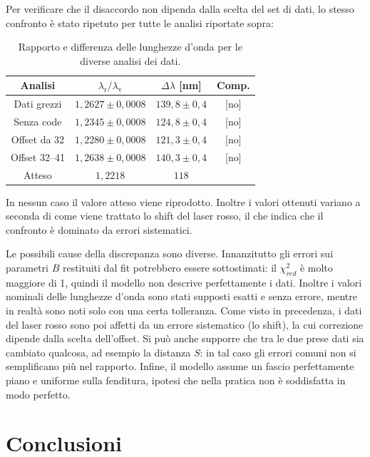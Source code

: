 \documentclass[10pt,twocolumn]{article}
\begin{document}
\noindent
Per verificare che il disaccordo non dipenda dalla scelta del set di dati, lo stesso confronto è stato ripetuto
per tutte le analisi riportate sopra:

\begin{table}[H]
  \centering
  \small
  \begin{tabular}{cccc}
    \toprule
    Analisi & $\lambda_{\mathrm{r}}/\lambda_{\mathrm{v}}$ & $\Delta\lambda$ [nm] & Comp. \\
    \midrule
    Dati grezzi & $1{,}2627 \pm 0{,}0008$ & $139{,}8 \pm 0{,}4$ & [no] \\
    Senza code & $1{,}2345 \pm 0{,}0008$ & $124{,}8 \pm 0{,}4$ & [no] \\
    Offset da 32 & $1{,}2280 \pm 0{,}0008$ & $121{,}3 \pm 0{,}4$ & [no] \\
    Offset 32--41 & $1{,}2638 \pm 0{,}0008$ & $140{,}3 \pm 0{,}4$ & [no] \\
    \midrule
    Atteso & $1{,}2218$ & $118$ & \\
    \bottomrule
  \end{tabular}
  \caption{Rapporto e differenza delle lunghezze d'onda per le diverse analisi dei dati.}
  \label{tab:robustezza_lambda}
\end{table}

\noindent
In nessun caso il valore atteso viene riprodotto. Inoltre i valori ottenuti variano a seconda di come viene trattato
lo shift del laser rosso, il che indica che il confronto è dominato da errori sistematici.

Le possibili cause della discrepanza sono diverse. Innanzitutto gli errori sui parametri $B$ restituiti dal fit
potrebbero essere sottostimati: il $\chi^2_{red}$ è molto maggiore di 1, quindi il modello non descrive perfettamente i dati.
Inoltre i valori nominali delle lunghezze d'onda sono stati supposti esatti e senza errore, mentre in realtà sono noti
solo con una certa tolleranza. Come visto in precedenza, i dati del laser rosso sono poi affetti da un errore sistematico
(lo shift), la cui correzione dipende dalla scelta dell'offset. Si può anche supporre che tra le due prese dati sia cambiato
qualcosa, ad esempio la distanza $S$: in tal caso gli errori comuni non si semplificano più nel rapporto.
Infine, il modello assume un fascio perfettamente piano e uniforme sulla fenditura, ipotesi che nella pratica
non è soddisfatta in modo perfetto.


\section{Conclusioni}
\end{document}
